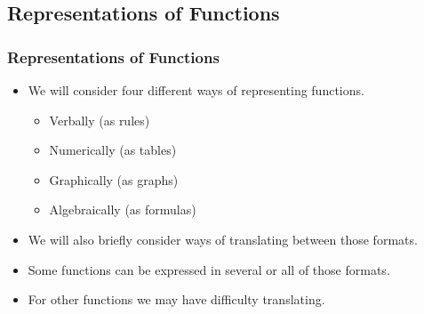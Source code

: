 \documentclass[serif,ignorenonframetext]{beamer}
\begin{document}
\begin{frame}
\begin{columns}
{
  }
  \end{columns}
\end{frame}


\subsection{Representations of Functions}

\begin{frame}
  \frametitle{Representations of Functions}
  \begin{itemize}[<+->]
  \item We will consider four different ways of representing functions.
    \begin{itemize}[<+->]
    \item Verbally (as rules)
    \item Numerically (as tables)
    \item Graphically (as graphs)
    \item Algebraically (as formulas)
    \end{itemize}
  \item We will also briefly consider ways of translating between
    those formats. 
  \item Some functions can be expressed in several or all of those
    formats. 
  \item For other functions we may have difficulty translating.
  \end{itemize}
\end{frame}
\end{document}

